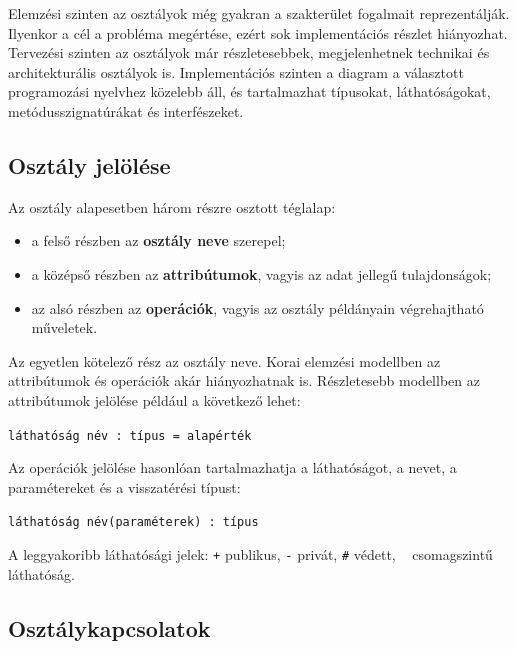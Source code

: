 Elemzési szinten az osztályok még gyakran a szakterület fogalmait reprezentálják. Ilyenkor a cél a probléma megértése, ezért sok implementációs részlet hiányozhat. Tervezési szinten az osztályok már részletesebbek, megjelenhetnek technikai és architekturális osztályok is. Implementációs szinten a diagram a választott programozási nyelvhez közelebb áll, és tartalmazhat típusokat, láthatóságokat, metódusszignatúrákat és interfészeket.



\subsection{Osztály jelölése}

Az osztály alapesetben három részre osztott téglalap:

\begin{itemize}
  \item a felső részben az \textbf{osztály neve} szerepel;
  \item a középső részben az \textbf{attribútumok}, vagyis az adat jellegű tulajdonságok;
  \item az alsó részben az \textbf{operációk}, vagyis az osztály példányain végrehajtható műveletek.
\end{itemize}

Az egyetlen kötelező rész az osztály neve. Korai elemzési modellben az attribútumok és operációk akár hiányozhatnak is. Részletesebb modellben az attribútumok jelölése például a következő lehet:

\begin{center}
\texttt{láthatóság név : típus = alapérték}
\end{center}

Az operációk jelölése hasonlóan tartalmazhatja a láthatóságot, a nevet, a paramétereket és a visszatérési típust:

\begin{center}
\texttt{láthatóság név(paraméterek) : típus}
\end{center}

A leggyakoribb láthatósági jelek: \texttt{+} publikus, \texttt{-} privát, \texttt{\#} védett, \texttt{\string~} csomagszintű láthatóság.

\subsection{Osztálykapcsolatok}

